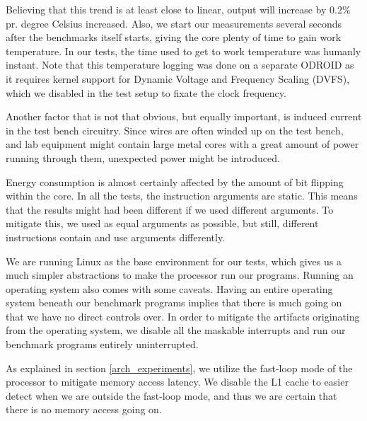 Believing that this trend is at least close to linear, output will increase by
0.2\% pr. degree Celsius increased. Also, we start our measurements several
seconds after the benchmarks itself starts, giving the core plenty of time to
gain work temperature. In our tests, the time used to get to work temperature
was humanly instant. Note that this temperature logging was done on a separate
ODROID as it requires kernel support for Dynamic Voltage and Frequency Scaling
(DVFS), which we disabled in the test setup to fixate the clock frequency.

Another factor that is not that obvious, but equally important, is induced current
in the test bench circuitry. Since wires are often winded up on the test
bench, and lab equipment might contain large metal cores with a great amount of
power running through them, unexpected power might be introduced.

Energy consumption is almost certainly affected by the amount of bit flipping
within the core. In all the tests, the instruction arguments are static. This
means that the results might had been different if we used different
arguments. To mitigate this, we used as equal arguments as possible, but still,
different instructions contain and use arguments differently.

We are running Linux as the base environment for our tests, which gives us a
much simpler abstractions to make the processor run our programs. Running an
operating system also comes with some caveats. Having an entire operating system
beneath our benchmark programs implies that there is much going on that we have
no direct controls over. In order to mitigate the artifacts originating from the
operating system, we disable all the maskable interrupts and run our benchmark
programs entirely uninterrupted.

As explained in section \autoref{arch_experiments}, we utilize the fast-loop mode of
the processor to mitigate memory access latency. We disable the L1 cache to
easier detect when we are outside the fast-loop mode, and thus we are certain
that there is no memory access going on.
